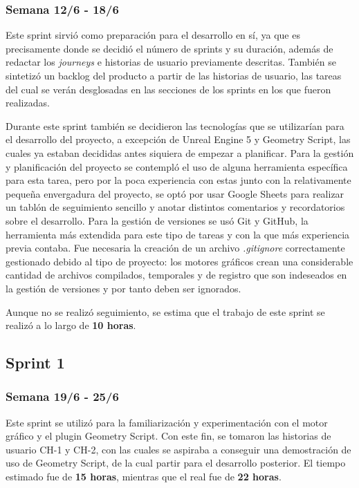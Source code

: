 \subsubsection*{Semana 12/6 - 18/6}

Este sprint sirvió como preparación para el desarrollo en sí, ya que es precisamente donde se decidió el número de sprints y su duración, además de redactar los \textit{journeys} e historias de usuario previamente descritas. También se sintetizó un backlog del producto a partir de las historias de usuario, las tareas del cual se verán desglosadas en las secciones de los sprints en los que fueron realizadas.

Durante este sprint también se decidieron las tecnologías que se utilizarían para el desarrollo del proyecto, a excepción de Unreal Engine 5 y Geometry Script, las cuales ya estaban decididas antes siquiera de empezar a planificar. Para la gestión y planificación del proyecto se contempló el uso de alguna herramienta específica para esta tarea, pero por la poca experiencia con estas junto con la relativamente pequeña envergadura del proyecto, se optó por usar Google Sheets para realizar un tablón de seguimiento sencillo y anotar distintos comentarios y recordatorios sobre el desarrollo. Para la gestión de versiones se usó Git y GitHub, la herramienta más extendida para este tipo de tareas y con la que más experiencia previa contaba. Fue necesaria la creación de un archivo \textit{.gitignore} correctamente gestionado debido al tipo de proyecto: los motores gráficos crean una considerable cantidad de archivos compilados, temporales y de registro que son indeseados en la gestión de versiones y por tanto deben ser ignorados.

Aunque no se realizó seguimiento, se estima que el trabajo de este sprint se realizó a lo largo de \textbf{10 horas}.

\subsection{Sprint 1}

\subsubsection*{Semana 19/6 - 25/6}

Este sprint se utilizó para la familiarización y experimentación con el motor gráfico y el plugin Geometry Script. Con este fin, se tomaron las historias de usuario CH-1 y CH-2, con las cuales se aspiraba a conseguir una demostración de uso de Geometry Script, de la cual partir para el desarrollo posterior. El tiempo estimado fue de \textbf{15 horas}, mientras que el real fue de \textbf{22 horas}.

